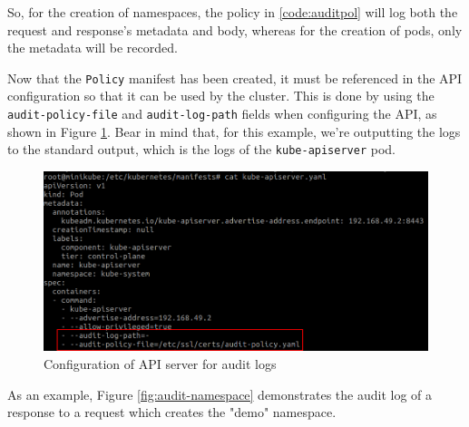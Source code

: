 \documentclass[a4paper,11pt,openright,BCOR=15mm]{scrbook}
\begin{document}
So, for the creation of namespaces, the policy in \ref{code:auditpol} will log both the request and response's metadata and body, whereas for the creation of pods, only the metadata will be recorded.

Now that the \texttt{Policy} manifest has been created, it must be referenced in the API configuration so that it can be used by the cluster. This is done by using the \texttt{audit-policy-file} and \texttt{audit-log-path} fields when configuring the API, as shown in Figure \ref{fig:auditconf}. Bear in mind that, for this example, we're outputting the logs to the standard output, which is the logs of the \texttt{kube-apiserver} pod.

\begin{figure}[h!]
	\centering
	\includegraphics[scale=0.5]{figs/api-config-audit.png}
	\caption{Configuration of API server for audit logs}
	\label{fig:auditconf}
\end{figure}

As an example, Figure \ref{fig:audit-namespace} demonstrates the audit log of a response to a request which creates the "demo" namespace.
\end{document}
